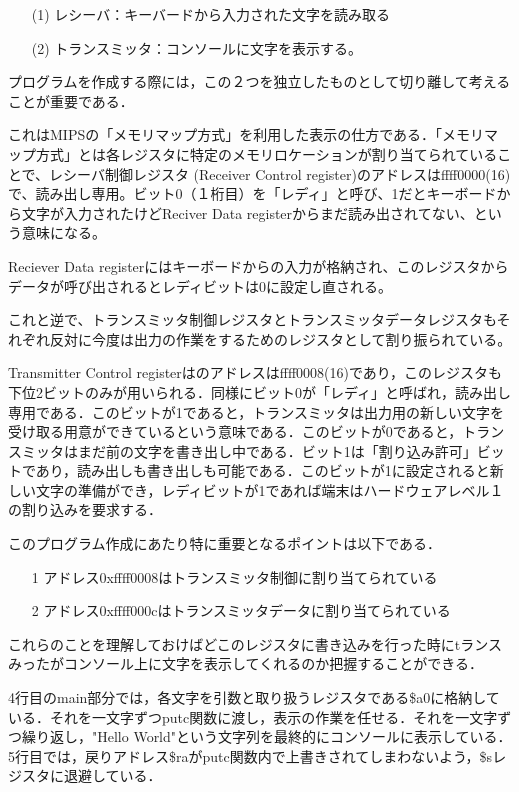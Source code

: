 \documentclass[a4j]{jarticle}
\begin{document}
\begin{itemize}
\item[(1)]レシーバ：キーバードから入力された文字を読み取る
\item[(2)]トランスミッタ：コンソールに文字を表示する。
\end{itemize}

プログラムを作成する際には，この２つを独立したものとして切り離して考えることが重要である．

これはMIPSの「メモリマップ方式」を利用した表示の仕方である．「メモリマップ方式」とは各レジスタに特定のメモリロケーションが割り当てられていることで、レシーバ制御レジスタ (Receiver Control register)のアドレスはffff0000(16)で、読み出し専用。ビット0（１桁目）を「レディ」と呼び、1だとキーボードから文字が入力されたけどReciver Data registerからまだ読み出されてない、という意味になる。

Reciever Data registerにはキーボードからの入力が格納され、このレジスタからデータが呼び出されるとレディビットは0に設定し直される。

これと逆で、トランスミッタ制御レジスタとトランスミッタデータレジスタもそれぞれ反対に今度は出力の作業をするためのレジスタとして割り振られている。

Transmitter Control registerはのアドレスはffff0008(16)であり，このレジスタも下位2ビットのみが用いられる．同様にビット0が「レディ」と呼ばれ，読み出し専用である．このビットが1であると，トランスミッタは出力用の新しい文字を受け取る用意ができているという意味である．このビットが0であると，トランスミッタはまだ前の文字を書き出し中である．ビット1は「割り込み許可」ビットであり，読み出しも書き出しも可能である．このビットが1に設定されると新しい文字の準備ができ，レディビットが1であれば端末はハードウェアレベル１の割り込みを要求する．

このプログラム作成にあたり特に重要となるポイントは以下である．

\begin{itemize}
\item[1]アドレス0xffff0008はトランスミッタ制御に割り当てられている
\item[2]アドレス0xffff000cはトランスミッタデータに割り当てられている
\end{itemize}

これらのことを理解しておけばどこのレジスタに書き込みを行った時にtランスみったがコンソール上に文字を表示してくれるのか把握することができる．

4行目のmain部分では，各文字を引数と取り扱うレジスタである\$a0に格納している．それを一文字ずつputc関数に渡し，表示の作業を任せる．それを一文字ずつ繰り返し，"Hello World"という文字列を最終的にコンソールに表示している．5行目では，戻りアドレス\$raがputc関数内で上書きされてしまわないよう，\$sレジスタに退避している．
\end{document}

